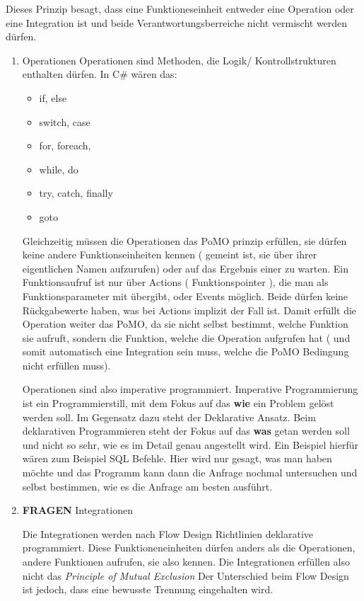 \documentclass[11pt]{article}
\begin{document}
Dieses Prinzip besagt, dass eine Funktioneseinheit entweder eine Operation oder eine Integration ist und beide
Verantwortungsberreiche nicht vermischt werden dürfen.

\begin{enumerate}
\item Operationen
\label{sec:orgheadline20}
Operationen sind Methoden, die Logik/ Kontrollstrukturen enthalten dürfen. In C\# wären das:
\begin{itemize}
\item if, else
\item switch, case
\item for, foreach,
\item while, do
\item try, catch, finally
\item goto
\end{itemize}




Gleichzeitig müssen die Operationen das PoMO prinzip erfüllen, sie dürfen keine
andere Funktionseinheiten kennen ( gemeint ist, sie über ihrer eigentlichen
Namen aufzurufen) oder auf das Ergebnis einer zu warten. 
Ein Funktionsaufruf ist nur über Actions ( Funktionspointer ), die man als Funktionsparameter mit übergibt, oder Events möglich.
Beide dürfen keine Rückgabewerte haben, was bei Actions implizit der Fall ist.
Damit erfüllt die Operation weiter das PoMO, da sie nicht selbst bestimmt, welche Funktion sie aufruft, sondern die Funktion,
welche die Operation aufgrufen hat ( und somit automatisch eine Integration sein muss, welche die PoMO Bedingung nicht erfüllen muss).


Operationen sind also imperative programmiert. Imperative Programmierung ist ein Programmierstill,
mit dem Fokus auf das \textbf{wie} ein Problem gelöst werden soll.
Im Gegensatz dazu steht der Deklarative Ansatz.
Beim deklarativen Programmieren steht der Fokus auf das \textbf{was} getan werden soll und nicht so sehr,
wie es im Detail genau angestellt wird. Ein Beispiel hierfür wären zum Beispiel SQL Befehle.
Hier wird nur gesagt, was man haben möchte und das Programm kann dann die Anfrage nochmal untersuchen
und selbst bestimmen, wie es die Anfrage am besten ausführt.

\item {\bfseries\sffamily FRAGEN} Integrationen
\label{sec:orgheadline21}

Die Integrationen werden nach Flow Design Richtlinien deklarative programmiert.
Diese Funktioneneinheiten dürfen anders als die Operationen, andere Funktionen aufrufen, sie also kennen.
Die Integrationen erfüllen also nicht das \emph{Principle of Mutual Exclusion}
Der Unterschied beim Flow Design ist jedoch, dass eine bewusste Trennung eingehalten wird.


\end{enumerate}
\end{document}
